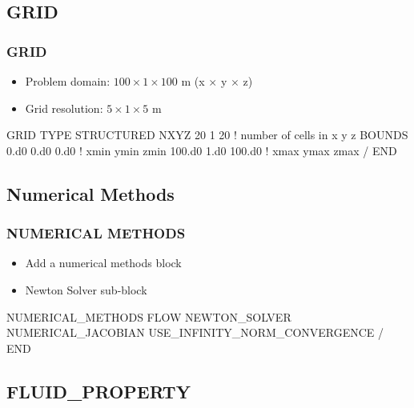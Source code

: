 \documentclass{beamer}
\newcommand\bluecomment[1]{{{\color{blue} #1}}}
\begin{document}
\subsection{GRID}

\begin{frame}[fragile]\frametitle{GRID}

\begin{itemize}
  \item Problem domain: $100 \times 1 \times 100$ m (x $\times$ y $\times$ z)
  \item Grid resolution: $5 \times 1 \times 5$ m
\end{itemize}

\begin{semiverbatim}
GRID
  TYPE STRUCTURED
  NXYZ 20 1 20         \bluecomment{! number of cells in x y z}
  BOUNDS
    0.d0 0.d0 0.d0     \bluecomment{! xmin ymin zmin}
    100.d0 1.d0 100.d0 \bluecomment{! xmax ymax zmax}
  /
END
\end{semiverbatim}

\end{frame}

\subsection{Numerical Methods}

\begin{frame}[fragile]\frametitle{NUMERICAL METHODS}

\begin{itemize}
\item Add a numerical methods block
\item Newton Solver sub-block
\end{itemize}

\begin{semiverbatim}
NUMERICAL_METHODS FLOW
  NEWTON_SOLVER
    NUMERICAL_JACOBIAN
    USE_INFINITY_NORM_CONVERGENCE
  /
END

\end{semiverbatim}

\end{frame}

\subsection{FLUID\_PROPERTY}
\end{document}
